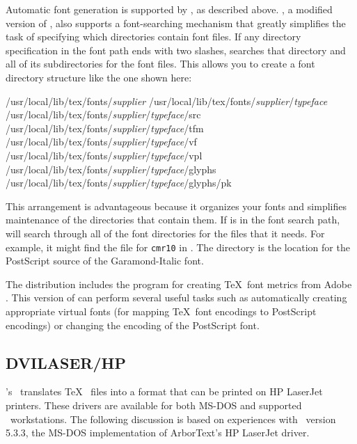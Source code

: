 Automatic font generation is supported by , as described
above.  , a modified version of , also 
supports a font-searching mechanism that 
greatly simplifies the task of specifying which directories contain
font files.  If any directory specification in the font path ends with
two slashes,  searches that directory and all of its
subdirectories for the font files.  This allows you to create a font
directory structure like the one shown here:

\begin{ttindent}
/usr/local/lib/tex/fonts/\textit{supplier}
/usr/local/lib/tex/fonts/\textit{supplier}/\textit{typeface}
/usr/local/lib/tex/fonts/\textit{supplier}/\textit{typeface}/src
/usr/local/lib/tex/fonts/\textit{supplier}/\textit{typeface}/tfm
/usr/local/lib/tex/fonts/\textit{supplier}/\textit{typeface}/vf
/usr/local/lib/tex/fonts/\textit{supplier}/\textit{typeface}/vpl
/usr/local/lib/tex/fonts/\textit{supplier}/\textit{typeface}/glyphs
/usr/local/lib/tex/fonts/\textit{supplier}/\textit{typeface}/glyphs/pk
\end{ttindent}

This arrangement is advantageous because it organizes your
fonts and simplifies maintenance of the directories
that contain them.  If  is 
in the font search path,  will search through
all of the font directories for the files that it needs.  For example,
it might find the  file for {\tt cmr10} in
. 
The directory 
is the location for the PostScript source of the Garamond-Italic font.

The  distribution includes the 
program for creating \TeX\ font metrics from Adobe .
This version of  can perform several useful tasks
such as automatically creating appropriate virtual fonts (for mapping
\TeX\ font encodings to PostScript encodings) or changing the encoding
of the PostScript font.

\subsection{DVILASER/HP}
\label{sec:pr:dvilaserhp}
\def\dvilaserhp{\program{DVILASER/HP}}

's \ixx{\dvilaserhp}{DVILASER/HP drivers} \dvidriver\ translates 
\TeX\  files into
a format that can be printed on HP LaserJet printers.  These drivers
are available for both MS-DOS and supported \Unix\ workstations.  The
following discussion is based on experiences with \dvilaserhp\
version 5.3.3, the MS-DOS implementation of ArborText's HP LaserJet driver.

